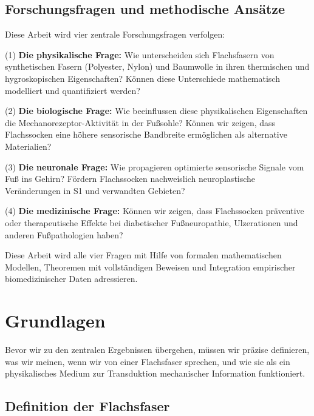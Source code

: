 \documentclass[a4paper,12pt]{article}
\theoremstyle{definition}
\begin{document}
\subsection{Forschungsfragen und methodische Ansätze}

Diese Arbeit wird vier zentrale Forschungsfragen verfolgen:

(1) \textbf{Die physikalische Frage:} Wie unterscheiden sich Flachsfasern von synthetischen Fasern (Polyester, Nylon) und Baumwolle in ihren thermischen und hygroskopischen Eigenschaften? Können diese Unterschiede mathematisch modelliert und quantifiziert werden?

(2) \textbf{Die biologische Frage:} Wie beeinflussen diese physikalischen Eigenschaften die Mechanorezeptor-Aktivität in der Fußsohle? Können wir zeigen, dass Flachssocken eine höhere sensorische Bandbreite ermöglichen als alternative Materialien?

(3) \textbf{Die neuronale Frage:} Wie propagieren optimierte sensorische Signale vom Fuß ins Gehirn? Fördern Flachssocken nachweislich neuroplastische Veränderungen in S1 und verwandten Gebieten?

(4) \textbf{Die medizinische Frage:} Können wir zeigen, dass Flachssocken präventive oder therapeutische Effekte bei diabetischer Fußneuropathie, Ulzerationen und anderen Fußpathologien haben?

Diese Arbeit wird alle vier Fragen mit Hilfe von formalen mathematischen Modellen, Theoremen mit vollständigen Beweisen und Integration empirischer biomedizinischer Daten adressieren.

\section{Grundlagen}

Bevor wir zu den zentralen Ergebnissen übergehen, müssen wir präzise definieren, was wir meinen, wenn wir von einer Flachsfaser sprechen, und wie sie als ein physikalisches Medium zur Transduktion mechanischer Information funktioniert.

\subsection{Definition der Flachsfaser}
\end{document}
